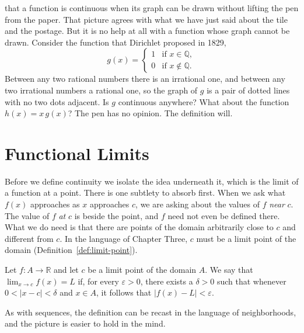  that a function is continuous when its graph can be drawn without lifting the pen from the paper.  That picture agrees with what we have just said about the tile and the postage.  But it is no help at all with a function whose graph cannot be drawn.  Consider the function that Dirichlet proposed in 1829,
\begin{displaymath}
   g(x) = \left\{
     \begin{array}{ll}
       1 & \text{if } x \in \mathbb{Q}, \\
       0 & \text{if } x \notin \mathbb{Q}.
     \end{array}
   \right.
\end{displaymath}
Between any two rational numbers there is an irrational one, and between any two irrational numbers a rational one, so the graph of $g$ is a pair of dotted lines with no two dots adjacent.  Is $g$ continuous anywhere?  What about the function $h(x) = x\,g(x)$?  The pen has no opinion.  The definition will.

\section{Functional Limits}

Before we define continuity we isolate the idea underneath it, which is the limit of a function at a point.  There is one subtlety to absorb first.  When we ask what $f(x)$ approaches as $x$ approaches $c$, we are asking about the values of $f$ \emph{near} $c$.  The value of $f$ \emph{at} $c$ is beside the point, and $f$ need not even be defined there.  What we do need is that there are points of the domain arbitrarily close to $c$ and different from $c$.  In the language of Chapter Three, $c$ must be a limit point of the domain (Definition~\ref{def:limit-point}).

\begin{definition}\label{def:functional-limit}
Let $f : A \to \mathbb{R}$ and let $c$ be a limit point of the domain $A$.  We say that $\lim_{x \to c} f(x) = L$ if, for every $\varepsilon > 0$, there exists a $\delta > 0$ such that whenever $0 < |x - c| < \delta$ and $x \in A$, it follows that $|f(x) - L| < \varepsilon$.
\end{definition}


As with sequences, the definition can be recast in the language of neighborhoods, and the picture is easier to hold in the mind.

